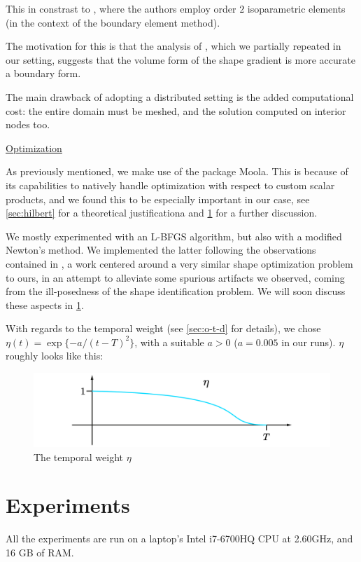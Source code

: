 \documentclass[english,a4paper,9pt,oneside]{scrbook}	%
\theoremstyle{break}
\theoremstyle{remark}
\begin{document}
This in constrast to \cite{harbrecht}, where the authors employ order $2$ isoparametric elements (in the context of the boundary element method).

The motivation for this is that the analysis of \cite{paganini}, which we partially repeated in our setting, suggests that the volume form of the shape gradient is more accurate a boundary form. 

The main drawback of adopting a distributed setting is the added computational cost: the entire domain must be meshed, and the solution computed on interior nodes too.

\underline{Optimization}

As previously mentioned, we make use of the package Moola. This is because of its capabilities to natively handle optimization with respect to custom scalar products, and we found this to be especially important in our case, see \cref{sec:hilbert} for a theoretical justificationa and \cref{sec:experiments} for a further discussion.

We mostly experimented with an L-BFGS algorithm, but also with a modified Newton's method. We implemented the latter following the observations contained in \cite{eppler}, a work centered around a very similar shape optimization problem to ours, in an attempt to alleviate some spurious artifacts we observed, coming from the ill-posedness of the shape identification problem. We will soon discuss these aspects in \cref{sec:experiments}.

With regards to the temporal weight (see \cref{sec:o-t-d} for details), we chose $\eta(t) = \exp\{-a/(t-T)^2\}$, with a suitable $a>0$ ($a=0.005$ in our runs). $\eta$ roughly looks like this:

\begin{figure}[H]
\centering
\includegraphics[width=0.5\columnwidth]{Images/Eta.pdf}
\caption{The temporal weight $\eta$}\label{fig:eta}
\end{figure}

\section{Experiments}
\label{sec:experiments}

All the experiments are run on a laptop's Intel i7-6700HQ CPU at 2.60GHz, and 16 GB of RAM.
\end{document}
